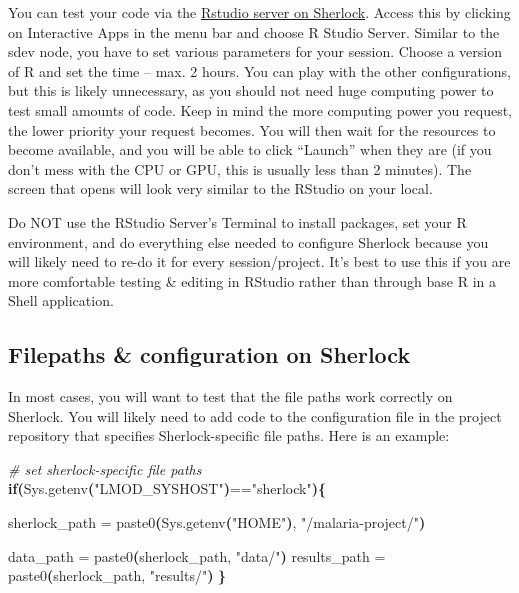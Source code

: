 \documentclass[
]{book}
\newenvironment{Shaded}{\begin{snugshade}}{\end{snugshade}}
\newcommand{\CommentTok}[1]{\textcolor[rgb]{0.56,0.35,0.01}{\textit{#1}}}
\newcommand{\ControlFlowTok}[1]{\textcolor[rgb]{0.13,0.29,0.53}{\textbf{#1}}}
\newcommand{\ErrorTok}[1]{\textcolor[rgb]{0.64,0.00,0.00}{\textbf{#1}}}
\newcommand{\ExtensionTok}[1]{#1}
\newcommand{\KeywordTok}[1]{\textcolor[rgb]{0.13,0.29,0.53}{\textbf{#1}}}
\newcommand{\NormalTok}[1]{#1}
\newcommand{\StringTok}[1]{\textcolor[rgb]{0.31,0.60,0.02}{#1}}
\begin{document}
You can test your code via the \href{https://www.sherlock.stanford.edu/docs/user-guide/ondemand/\#rstudio}{Rstudio server on Sherlock}. Access this by clicking on Interactive Apps in the menu bar and choose R Studio Server. Similar to the sdev node, you have to set various parameters for your session. Choose a version of R and set the time -- max. 2 hours. You can play with the other configurations, but this is likely unnecessary, as you should not need huge computing power to test small amounts of code. Keep in mind the more computing power you request, the lower priority your request becomes. You will then wait for the resources to become available, and you will be able to click ``Launch'' when they are (if you don't mess with the CPU or GPU, this is usually less than 2 minutes). The screen that opens will look very similar to the RStudio on your local.

Do NOT use the RStudio Server's Terminal to install packages, set your R environment, and do everything else needed to configure Sherlock because you will likely need to re-do it for every session/project. It's best to use this if you are more comfortable testing \& editing in RStudio rather than through base R in a Shell application.

\hypertarget{filepaths-configuration-on-sherlock}{%
\subsection{Filepaths \& configuration on Sherlock}\label{filepaths-configuration-on-sherlock}}

In most cases, you will want to test that the file paths work correctly on Sherlock. You will likely need to add code to the configuration file in the project repository that specifies Sherlock-specific file paths. Here is an example:

\begin{Shaded}
\begin{Highlighting}[]
\CommentTok{\# set sherlock{-}specific file paths}
\ControlFlowTok{if}\KeywordTok{(}\ExtensionTok{Sys.getenv}\ErrorTok{(}\StringTok{"LMOD\_SYSHOST"}\KeywordTok{)}\ExtensionTok{==}\StringTok{"sherlock"}\KeywordTok{)\{}
  
  \ExtensionTok{sherlock\_path}\NormalTok{ = paste0}\ErrorTok{(}\ExtensionTok{Sys.getenv}\ErrorTok{(}\StringTok{"HOME"}\KeywordTok{)}\ExtensionTok{,} \StringTok{"/malaria{-}project/"}\KeywordTok{)}
  
  \ExtensionTok{data\_path}\NormalTok{ = paste0}\ErrorTok{(}\ExtensionTok{sherlock\_path,} \StringTok{"data/"}\KeywordTok{)}
  \ExtensionTok{results\_path}\NormalTok{ = paste0}\ErrorTok{(}\ExtensionTok{sherlock\_path,} \StringTok{"results/"}\KeywordTok{)}
\KeywordTok{\}}
\end{Highlighting}
\end{Shaded}
\end{document}

